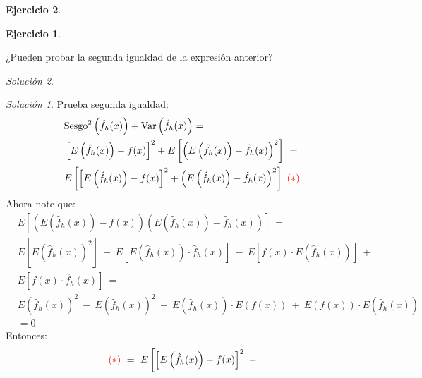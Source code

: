 \documentclass[
  12pt,
]{book}
\theoremstyle{definition}
\theoremstyle{definition}
\theoremstyle{definition}
\newtheorem{exercise}{Ejercicio}[chapter]
\theoremstyle{remark}
\newtheorem*{solution}{Solución}
\begin{document}
\begin{exercise}
\begin{exercise}
\protect\hypertarget{exr:unlabeled-div-2}{}\label{exr:unlabeled-div-2}

\protect\hypertarget{exr:unnamed-chunk-4}{}{\label{exr:unnamed-chunk-4} }¿Pueden probar la segunda igualdad de la expresión anterior?

\end{exercise}
\end{exercise}

\begin{solution}
\begin{solution}

{}Prueba segunda igualdad:
\begin{align*}
& \text{Sesgo}^2\left(\hat{f}_h(x)  \right) + \text{Var}\left( \hat{f}_h(x)\right)  = \\ & \left[ E\left(\hat{f}_h(x)\right) - f(x)\right]^2 + E\left[\left( E\left(\hat{f}_h(x)\right) - \hat{f}_h(x)\right)^2\right] \ =
\\ & E\left[\left[ E\left(\hat{f}_h(x)\right) - f(x)\right]^2 + \left( E\left(\hat{f}_h(x)\right) - \hat{f}_h(x)\right)^2   \right] \ \textcolor{red}{(*)} \
\end{align*}
Ahora note que:
\begin{align*}
& E\left[\left( E\left(\hat{f}_h(x)\right) - f(x)   \right) \left(E\left(\hat{f}_h(x)\right) - \hat{f}_h(x)    \right)    \right] \ = \                                      \\
& E\left[E\left(\hat{f}_h(x)\right)^2 \right] \ - \ E\left[E\left(\hat{f}_h(x)\right)\cdot \hat{f}_h(x) \right] \ - \ E\left[f(x)\cdot E\left(\hat{f}_h(x)\right)\right] \ + \\
& E\left[f(x)\cdot \hat{f}_h(x)\right]\ = \                                                                                                                                  \\
& E\left(\hat{f}_h(x)\right)^2  \ - \ E\left(\hat{f}_h(x)\right)^2  \ - \ E\left(\hat{f}_h(x)\right)\cdot E\left( f(x)\right) \ + \
E\left( f(x)\right)\cdot E\left(\hat{f}_h(x)\right) \                                                                                                                         \\
& = 0
\end{align*}
Entonces:
\begin{align*}
& \textcolor{red}{(*)} \ = \ E\left[\left[ E\left(\hat{f}_h(x)\right) - f(x)\right]^2 \ -  \right.                                                                                                         \\

\end{align*}
\end{solution}
\end{solution}
\end{document}
